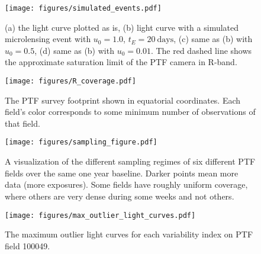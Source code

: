 \documentclass[12pt,preprint]{aastex}
\begin{document}
\clearpage
\setlength{\baselineskip}{0.6\baselineskip}

\setlength{\baselineskip}{1.667\baselineskip}


%
%

\begin{figure}
	\centering
	\caption{(a) the light curve plotted as is, (b) light curve with a simulated microlensing event with $u_0=1.0$, $t_E=20~\mathrm{days}$, (c) same as (b) with $u_0=0.5$, (d) same as (b) with $u_0=0.01$. The red dashed line shows the approximate saturation limit of the PTF camera in R-band.}
    \texttt{[image: figures/simulated\_events.pdf]}
    \label{fig:microlensing_sim}
\end{figure}

\begin{figure}
	\centering
	\caption{The PTF survey footprint shown in equatorial coordinates. Each field's color corresponds to some minimum number of observations of that field. }
    \texttt{[image: figures/R\_coverage.pdf]}
    \label{fig:survey_footprint}
\end{figure}	

\begin{figure}
	\centering
	\caption{A visualization of the different sampling regimes of six different PTF fields over the same one year baseline. Darker points mean more data (more exposures). Some fields have roughly uniform coverage, where others are very dense during some weeks and not others. }
    \texttt{[image: figures/sampling\_figure.pdf]}
    \label{fig:sampling}
\end{figure}

\begin{figure}
	\centering
	\caption{The maximum outlier light curves for each variability index on PTF field 100049.}
    \texttt{[image: figures/max\_outlier\_light\_curves.pdf]}
    \label{fig:indices_examples}
\end{figure}

%
%
\end{document}
